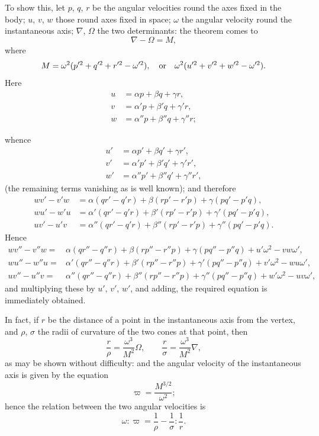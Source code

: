 \documentclass[11pt]{article}
\begin{document}
To show this, let $p$, $q$, $r$ be the angular velocities round the axes fixed in the
body; $u$, $v$, $w$ those round axes fixed in space; $\omega$ the angular velocity round
the instantaneous axis; $\nabla$, $\Omega$ the two determinants: the theorem comes to
\[
\nabla-\Omega=M,
\]
where
\[
M=\omega^2(p'^2+q'^2+r'^2-\omega'^2),\quad
\hbox{or}\quad
\omega^2(u'^2+v'^2+w'^2-\omega'^2).
\]
Here
\[
\begin{aligned}
u&=\alpha p+\beta q+\gamma r,\\
v&=\alpha' p+\beta' q+\gamma' r,\\
w&=\alpha'' p+\beta'' q+\gamma'' r;
\end{aligned}
\]

\newpage
\setcounter{page}{236}

whence
\[
\begin{aligned}
u'&=\alpha p'+\beta q'+\gamma r',\\
v'&=\alpha' p'+\beta' q'+\gamma' r',\\
w'&=\alpha'' p'+\beta'' q'+\gamma'' r',
\end{aligned}
\]
(the remaining terms vanishing as is well known); and therefore
\[
\begin{aligned}
wv'-v'w&=\alpha(qr'-q'r)+\beta(rp'-r'p)+\gamma(pq'-p'q),\\
wu'-w'u&=\alpha'(qr'-q'r)+\beta'(rp'-r'p)+\gamma'(pq'-p'q),\\
uv'-u'v&=\alpha''(qr'-q'r)+\beta''(rp'-r'p)+\gamma''(pq'-p'q).
\end{aligned}
\]
Hence
\[
\begin{aligned}
wv''-v''w={}&\alpha(qr''-q''r)+\beta(rp''-r''p)+\gamma(pq''-p''q)
             +u'\omega^2-vw\omega',\\
wu''-w''u={}&\alpha'(qr''-q''r)+\beta'(rp''-r''p)+\gamma'(pq''-p''q)
             +v'\omega^2-wu\omega',\\
uv''-u''v={}&\alpha''(qr''-q''r)+\beta''(rp''-r''p)+\gamma''(pq''-p''q)
             +w'\omega^2-uv\omega',
\end{aligned}
\]
and multiplying these by $u'$, $v'$, $w'$, and adding, the required equation is
immediately obtained.

In fact, if $r$ be the distance of a point in the instantaneous axis from the vertex,
and $\rho$, $\sigma$ the radii of curvature of the two cones at that point, then
\[
\frac{r}{\rho}=\frac{\omega^3}{M^2}\Omega,\qquad
\frac{r}{\sigma}=\frac{\omega^3}{M^2}\nabla,
\]
as may be shown without difficulty: and the angular velocity of the instantaneous axis
is given by the equation
\[
\varpi=\frac{M^{3/2}}{\omega^2};
\]
hence the relation between the two angular velocities is
\[
\omega:\varpi=\frac{1}{\rho}-\frac{1}{\sigma}:\frac{1}{r}.
\]
\end{document}
